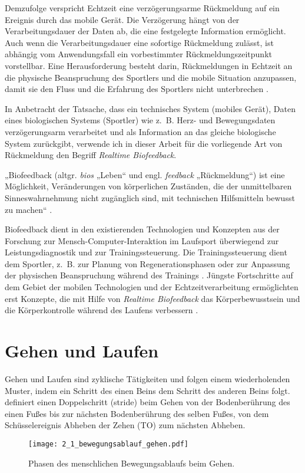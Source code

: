 Demzufolge verspricht Echtzeit eine verzögerungsarme Rückmeldung auf ein Ereignis durch das mobile Gerät. Die Verzögerung hängt von der Verarbeitungsdauer der Daten ab, die eine festgelegte Information ermöglicht. Auch wenn die Verarbeitungsdauer eine sofortige Rückmeldung zulässt, ist abhängig vom Anwendungsfall ein vorbestimmter Rückmeldungszeitpunkt vorstellbar. Eine Herausforderung besteht darin, Rückmeldungen in Echtzeit an die physische Beanspruchung des Sportlers und die mobile Situation anzupassen, damit sie den Fluss und die Erfahrung des Sportlers nicht unterbrechen \citep[][]{Nylander2014}.

In Anbetracht der Tatsache, dass ein technisches System (mobiles Gerät), Daten eines biologischen Systems (Sportler) wie z.~B. Herz- und Bewegungsdaten verzögerungsarm verarbeitet und als Information an das gleiche biologische System zurückgibt, verwende ich in dieser Arbeit für die vorliegende Art von Rückmeldung den Begriff \emph{Realtime Biofeedback}.

„Biofeedback (altgr. \emph{bios} „Leben“ und engl. \emph{feedback} „Rückmeldung“) ist eine Möglichkeit, Veränderungen von körperlichen Zuständen, die der unmittelbaren Sinneswahrnehmung nicht zugänglich sind, mit technischen Hilfsmitteln bewusst zu machen“ \citep[][S.~483]{Riemer2015}.

Biofeedback dient in den existierenden Technologien und Konzepten aus der Forschung zur Mensch-Computer-Interaktion im Laufsport überwiegend zur Leistungsdiagnostik und zur Trainingssteuerung. Die Trainingssteuerung dient dem Sportler, z.~B. zur Planung von Regenerationsphasen oder zur Anpassung der physischen Beanspruchung während des Trainings \citep[][S.~81-107]{Marquardt2011}. Jüngste Fortschritte auf dem Gebiet der mobilen Technologien und der Echtzeitverarbeitung ermöglichten erst Konzepte, die mit Hilfe von \emph{Realtime Biofeedback} das Körperbewusstsein und die Körperkontrolle während des Laufens verbessern \citep[][]{Strohrmann2013, Strohrmann2013a, Strohrmann2014}.

\section{Gehen und Laufen} 

\label{sec:gehen_und_laufen}

Gehen und Laufen sind zyklische Tätigkeiten und folgen einem wiederholenden Muster, indem ein Schritt des einen Beins dem Schritt des anderen Beins folgt. \citet[][S.~9]{Bartlett2007} definiert einen Doppelschritt (stride) beim Gehen von der Bodenberührung des einen Fußes bis zur nächsten Bodenberührung des selben Fußes, von dem Schüsselereignis Abheben der Zehen (\ac{TO}) zum nächsten Abheben. 
\begin{figure}
	[t] \centering 
	\texttt{[image: 2\_1\_bewegungsablauf\_gehen.pdf]} \caption[Phasen des menschlichen Bewegungsablaufs beim Gehen]{Phasen des menschlichen Bewegungsablaufs beim Gehen.}\label{fig:2_1_bewegungsablauf_gehen} 
\end{figure}

